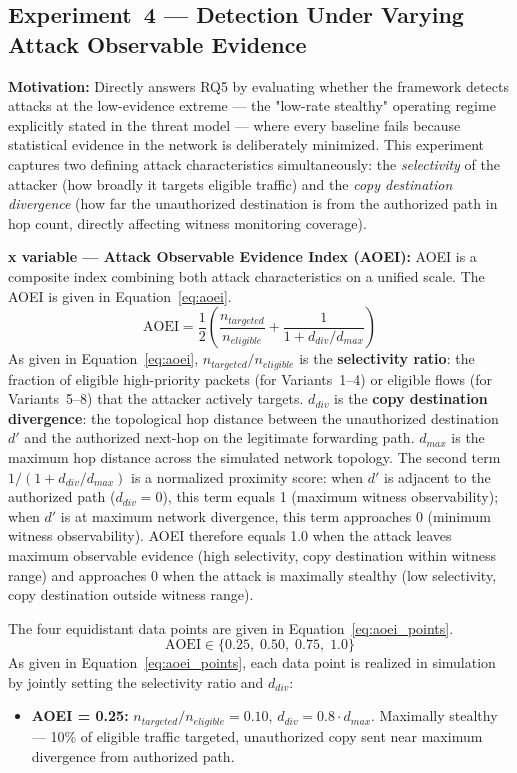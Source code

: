 \documentclass[12pt, a4paper]{report}
\begin{document}
{{\subsection{Experiment~4 — Detection Under Varying
Attack Observable Evidence}
\label{sec:exp4}

\textbf{Motivation:} Directly answers RQ5 by
evaluating whether the framework detects attacks at
the low-evidence extreme — the "low-rate stealthy"
operating regime explicitly stated in the threat
model — where every baseline fails because
statistical evidence in the network is deliberately
minimized. This experiment captures two defining
attack characteristics simultaneously: the
\textit{selectivity} of the attacker (how broadly
it targets eligible traffic) and the
\textit{copy destination divergence} (how far the
unauthorized destination is from the authorized
path in hop count, directly affecting witness
monitoring coverage).

\textbf{x variable — Attack Observable Evidence
Index (AOEI):}
AOEI is a composite index combining both attack
characteristics on a unified scale. The AOEI is
given in Equation~\eqref{eq:aoei}.
\begin{equation}
\text{AOEI} =
\frac{1}{2}
\left(
\frac{n_{targeted}}{n_{eligible}}
+
\frac{1}{1 + d_{div}/d_{max}}
\right)
\label{eq:aoei}
\end{equation}
As given in Equation~\eqref{eq:aoei},
$n_{targeted}/n_{eligible}$ is the
\textbf{selectivity ratio}: the fraction of
eligible high-priority packets (for Variants~1--4)
or eligible flows (for Variants~5--8) that the
attacker actively targets. $d_{div}$ is the
\textbf{copy destination divergence}: the
topological hop distance between the unauthorized
destination $d'$ and the authorized next-hop on
the legitimate forwarding path. $d_{max}$ is the
maximum hop distance across the simulated network
topology. The second term $1/(1 + d_{div}/d_{max})$
is a normalized proximity score: when $d' $ is
adjacent to the authorized path ($d_{div} = 0$),
this term equals 1 (maximum witness observability);
when $d'$ is at maximum network divergence, this
term approaches 0 (minimum witness observability).
AOEI therefore equals 1.0 when the attack leaves
maximum observable evidence (high selectivity,
copy destination within witness range) and
approaches 0 when the attack is maximally
stealthy (low selectivity, copy destination
outside witness range).

The four equidistant data points are given in
Equation~\eqref{eq:aoei_points}.
\begin{equation}
\text{AOEI} \in
\{0.25,\; 0.50,\; 0.75,\; 1.0\}
\label{eq:aoei_points}
\end{equation}
As given in Equation~\eqref{eq:aoei_points}, each
data point is realized in simulation by jointly
setting the selectivity ratio and $d_{div}$:
\begin{itemize}
    \item \textbf{AOEI = 0.25:}
    $n_{targeted}/n_{eligible} = 0.10$,
    $d_{div} = 0.8 \cdot d_{max}$.
    Maximally stealthy — 10\% of eligible
    traffic targeted, unauthorized copy sent
    near maximum divergence from authorized path.


\end{itemize}}}
\end{document}
